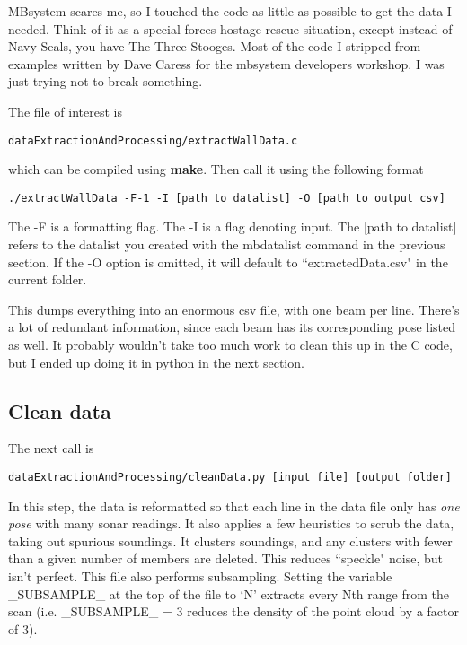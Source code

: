 \documentclass[12pt]{amsart}
\begin{document}
MBsystem scares me, so I touched the code as little as possible to get the data I needed. Think of it as a special forces hostage rescue situation, except instead of Navy Seals, you have The Three Stooges. Most of the code I stripped from examples written by Dave Caress for the mbsystem developers workshop. I was just trying not to break something. 

The file of interest is 
\begin{lstlisting}
dataExtractionAndProcessing/extractWallData.c
\end{lstlisting}
which can be compiled using \textbf{make}.
\vspace{12pt}
Then call it using the following format
\begin{small}
\begin{lstlisting}
./extractWallData -F-1 -I [path to datalist] -O [path to output csv]
\end{lstlisting}
\end{small}
The -F is a formatting flag. The -I is a flag denoting input. The [path to datalist] refers to the datalist you created with the mbdatalist command in the previous section. If the -O option is omitted, it will default to ``extractedData.csv" in the current folder.

This dumps everything into an enormous csv file, with one beam per line. There's a lot of redundant information, since each beam has its corresponding pose listed as well. It probably wouldn't take too much work to clean this up in the C code, but I ended up doing it in python in the next section.  

\subsection{Clean data}
The next call is 
\begin{lstlisting}
dataExtractionAndProcessing/cleanData.py [input file] [output folder]
\end{lstlisting}

In this step, the data is reformatted so that each line in the data file only has \emph{one pose} with many sonar readings. It also applies a few heuristics to scrub the data, taking out spurious soundings. It clusters soundings, and any clusters with fewer than a given number of members are deleted. This reduces ``speckle" noise, but isn't perfect. This file also performs subsampling. Setting the variable \_SUBSAMPLE\_ at the top of the file to `N' extracts every Nth range from the scan (i.e. \_SUBSAMPLE\_ = 3 reduces the density of the point cloud by a factor of 3).
\end{document}
